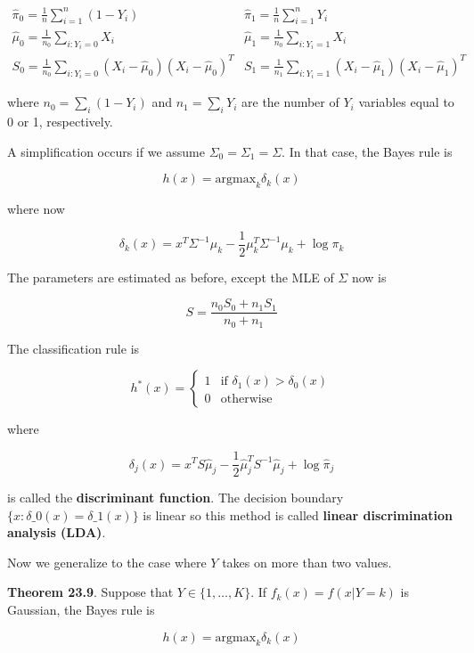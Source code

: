 \[
\begin{array}{cc}
\hat{\pi}_{0} = \frac{1}{n} \sum_{i=1}^{n} (1 - Y_{i}) & \hat{\pi}_{1} = \frac{1}{n} \sum_{i=1}^{n} Y_{i} \\
\hat{\mu}_{0} = \frac{1}{n_{0}} \sum_{i: Y_{i} = 0} X_{i} & \hat{\mu}_{1} = \frac{1}{n_{0}} \sum_{i: Y_{i} = 1} X_{i} \\
S_{0} = \frac{1}{n_{0}} \sum_{i: Y_{i} = 0} (X_{i} - \hat{\mu}_{0}) (X_{i} - \hat{\mu}_{0})^T & 
S_{1} = \frac{1}{n_{1}} \sum_{i: Y_{i} = 1} (X_{i} - \hat{\mu}_{1}) (X_{i} - \hat{\mu}_{1})^T
\end{array}
\]

where \(n_{0} = \sum_{i} (1 - Y_{i})\) and \(n_{1} = \sum_{i} Y_{i}\) are the number
of \(Y_{i}\) variables equal to 0 or 1, respectively.

A simplification occurs if we assume \(\Sigma_{0} = \Sigma_{1} = \Sigma\).
In that case, the Bayes rule is

\[ h(x) = \text{argmax}_{k} \delta_{k}(x) \]

where now

\[ \delta_{k}(x) = x^T \Sigma^{-1} \mu_{k} - \frac{1}{2} \mu_{k}^T \Sigma^{-1} \mu_{k} + \log \pi_{k} \]

The parameters are estimated as before, except the MLE of \(\Sigma\) now
is

\[ S = \frac{n_{0} S_{0} + n_{1} S_{1}}{n_{0} + n_{1}} \]

The classification rule is

\[
h^*(x) = \begin{cases}
1 &\text{if } \delta_{1}(x) > \delta_{0}(x) \\
0 &\text{otherwise}
\end{cases}
\]

where

\[ \delta_{j}(x) = x^T S \hat{\mu}_{j} - \frac{1}{2} \hat{\mu}_{j}^T S^{-1} \hat{\mu}_{j} + \log \hat{\pi}_{j} \]

is called the \textbf{discriminant function}. The decision boundary $
\{ x : \delta\_{0}(x) = \delta\_{1}(x) \}$ is linear so this method is
called \textbf{linear discrimination analysis (LDA)}.

Now we generalize to the case where \(Y\) takes on more than two values.

\textbf{Theorem 23.9}. Suppose that \(Y \in \{ 1, \dots, K \}\). If
\(f_{k}(x) = f(x | Y = k)\) is Gaussian, the Bayes rule is

\[ h(x) = \text{argmax}_{k} \delta_{k}(x) \]

